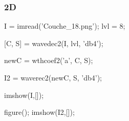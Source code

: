 \subsubsection{2D}
\begin{matlab}
I = imread('Couche_18.png');
lvl = 8;

[C, S] = wavedec2(I, lvl, 'db4');

newC = wthcoef2('a', C, S);

I2 = waverec2(newC, S, 'db4');

imshow(I,[]);

figure(); imshow(I2,[]);
\end{matlab}
